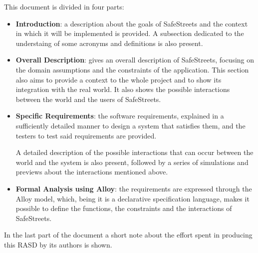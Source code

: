 This document is divided in four parts:
\begin{itemize}
	\item \textbf{Introduction}: a description about the goals of SafeStreets and the context in which it will be implemented is provided. A subsection dedicated to the understaing of some acronyms and definitions is also present. 
	
	\item \textbf{Overall Description}: gives an overall description of SafeStreets, focusing on the domain assumptions and the constraints of the application. This section also aims to provide a context to the whole project and to show its integration with the real world. It also shows the possible interactions between the world and the users of SafeStreets. 
	
	\item \textbf{Specific Requirements}: the software requirements, explained in a sufficiently detailed manner to design a system that satisfies them, and the testers to test said requirements are provided.
		
		A detailed description of the possible interactions that can occur between the world and the system is also present, followed by a series of simulations and previews about the interactions mentioned above.
	
	\item \textbf{Formal Analysis using Alloy}: the requirements are expressed through the Alloy model, which, being it is a declarative specification language, makes it possible to define the functions, the constraints and the interactions of SafeStreets.
\end{itemize}
In the last part of the document a short note about the effort spent in producing this RASD by its authors is shown.